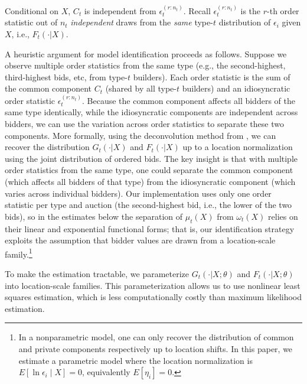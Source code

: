 \documentclass[12pt,reqno]{amsart}
\begin{document}
Conditional on $X$, $C_{t}$ is independent from $\epsilon _{t}^{(r:n_{t})}$. Recall $\epsilon _{t}^{(r:n_{t})}$ is the $r$-th order statistic out of $n_{t}$ \textit{independent} draws from the \textit{same} type-$t$ distribution of $\epsilon _{i}$ given $X$, i.e., $F_{t}(\cdot |X)$.

A heuristic argument for model identification proceeds as follows. Suppose we observe multiple order statistics from the same type (e.g., the second-highest, third-highest bids, etc, from type-$t$ builders). Each order statistic is the sum of the common component $C_t$ (shared by all type-$t$ builders) and an idiosyncratic order statistic $\epsilon_t^{(r:n_t)}$. Because the common component affects all bidders of the same type identically, while the idiosyncratic components are independent across bidders, we can use the variation across order statistics to separate these two components. More formally, using the deconvolution method from \cite{cho2024deconvolution}, we can recover the distribution $G_{t}(\cdot |X)$ and $F_{t}(\cdot |X)$ up to a location normalization using the joint distribution of ordered bids. The key insight is that with multiple order statistics from the same type, one could separate the common component (which affects all bidders of that type) from the idiosyncratic component (which varies across individual bidders). Our implementation uses only one order statistic per type and auction (the second-highest bid, i.e., the lower of the two bids), so in the estimates below the separation of $\mu_t(X)$ from $\omega_t(X)$ relies on their linear and exponential functional forms; that is, our identification strategy exploits the assumption that bidder values are drawn from a location-scale family.\footnote{
    In a nonparametric model, one can only recover the distribution of common and private components respectively up to location shifts. In this paper, we estimate a parametric model where the location normalization is $E[\ln\epsilon_i\mid X]=0$, equivalently $E[\eta_i]=0$.}

To make the estimation tractable, we parameterize $G_{t}(\cdot |X;\theta )$ and $F_{t}(\cdot |X;\theta )$ into location-scale families. This parameterization allows us to use nonlinear least squares estimation, which is less computationally costly than maximum likelihood estimation.
\end{document}
